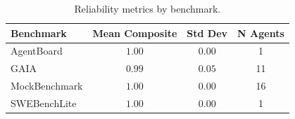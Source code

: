 \begin{table}[t]
\centering
\caption{Reliability metrics by benchmark.}
\label{tab:benchmark}
\begin{tabular}{lccc}
\toprule
Benchmark & Mean Composite & Std Dev & N Agents \\
\midrule
AgentBoard & $1.00$ & $0.00$ & 1 \\
GAIA & $0.99$ & $0.05$ & 11 \\
MockBenchmark & $1.00$ & $0.00$ & 16 \\
SWEBenchLite & $1.00$ & $0.00$ & 1 \\
\bottomrule
\end{tabular}
\end{table}
